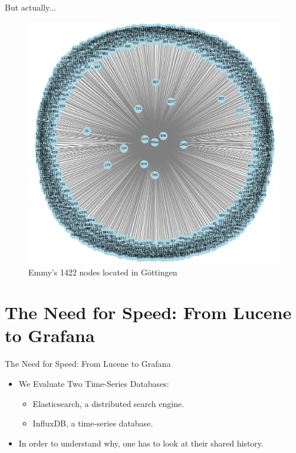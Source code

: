 \documentclass[compress,aspectratio=169]{beamer}
\begin{document}
\begin{frame}{But actually...}
\begin{center}
\begin{figure}
  \includegraphics[height=.8\textheight]{assets/monitoring_system_architecture_2.png}
  \caption{Emmy's 1422 nodes located in G\"ottingen}
\end{figure}
\end{center}
\end{frame}

\section[Overview]{The Need for Speed: From Lucene to Grafana}
\begin{frame}{The Need for Speed: From Lucene to Grafana}
  \begin{itemize}
    \item We Evaluate Two Time-Series Databases:
    \begin{itemize}
      \item Elasticsearch, a distributed search engine.
      \item InfluxDB, a time-series database.
    \end{itemize}
  \item In order to understand why, one has to look at their shared history.
  \end{itemize}
\end{frame}
\end{document}
